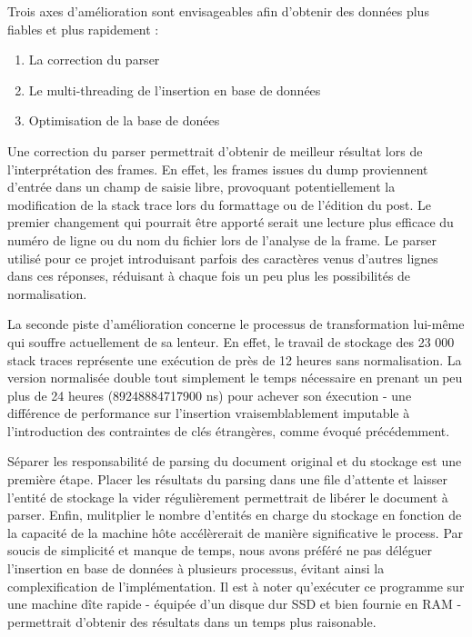 \documentclass[11pt,a4paper]{article}
\begin{document}
Trois axes d'amélioration sont envisageables afin d'obtenir des données plus fiables et plus rapidement :
\begin{enumerate}
\item La correction du parser
\item Le multi-threading de l'insertion en base de données
\item Optimisation de la base de donées\newline
\end{enumerate}

Une correction du parser permettrait d'obtenir de meilleur résultat lors de l'interprétation des frames.
En effet, les frames issues du dump proviennent d'entrée dans un champ de saisie libre, provoquant potentiellement la modification de la stack trace lors du formattage ou de l'édition du post.
Le premier changement qui pourrait être apporté serait une lecture plus efficace du numéro de ligne ou du nom du fichier lors de l'analyse de la frame.
Le parser utilisé pour ce projet introduisant parfois des caractères venus d'autres lignes dans ces réponses, réduisant à chaque fois un peu plus les possibilités de normalisation.
\newline

La seconde piste d'amélioration concerne le processus de transformation lui-même qui souffre actuellement de sa lenteur.
En effet, le travail de stockage des 23 000 stack traces représente une exécution de près de 12 heures sans normalisation.
La version normalisée double tout simplement le temps nécessaire en prenant un peu plus de 24 heures (89248884717900 ns) pour achever son éxecution - une différence de performance sur l'insertion vraisemblablement imputable à l'introduction des contraintes de clés étrangères, comme évoqué précédemment.

Séparer les responsabilité de parsing du document original et du stockage est une première étape.
Placer les résultats du parsing dans une file d'attente et laisser l'entité de stockage la vider régulièrement permettrait de libérer le document à parser.
Enfin, mulitplier le nombre d'entités en charge du stockage en fonction de la capacité de la machine hôte accélèrerait de manière significative le process.
Par soucis de simplicité et manque de temps, nous avons préféré ne pas déléguer l'insertion en base de données à plusieurs processus, évitant ainsi la complexification de l'implémentation.
Il est à noter qu'exécuter ce programme sur une machine dîte rapide - équipée d'un disque dur SSD et bien fournie en RAM - permettrait d'obtenir des résultats dans un temps plus raisonable.
\newline
\end{document}
